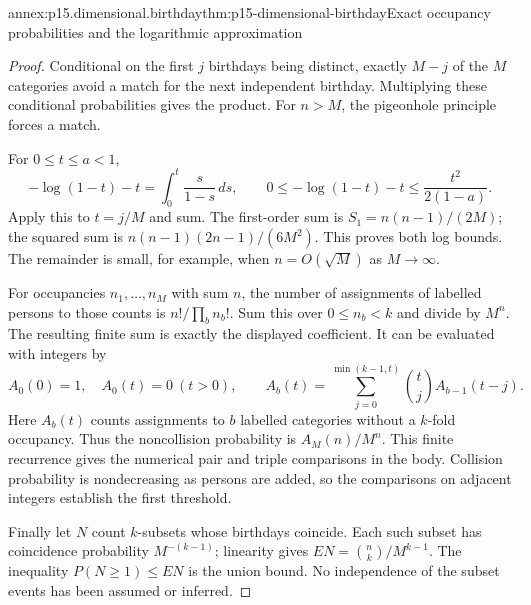 \begin{annexitem}{annex:p15.dimensional.birthday}{thm:p15-dimensional-birthday}{Exact occupancy probabilities and the logarithmic approximation}
\begin{proof}
Conditional on the first \(j\) birthdays being distinct, exactly \(M-j\)
of the \(M\) categories avoid a match for the next independent birthday.
Multiplying these conditional probabilities gives the product.
For \(n>M\), the pigeonhole principle forces a match.

For \(0\leq t\leq a<1\),
\[
 -\log(1-t)-t=\int_0^t\frac{s}{1-s}\,ds,
 \qquad
 0\leq-\log(1-t)-t\leq\frac{t^2}{2(1-a)}.
\]
Apply this to \(t=j/M\) and sum. The first-order sum is
\(S_1=n(n-1)/(2M)\); the squared sum is
\(n(n-1)(2n-1)/(6M^2)\). This proves both log bounds.
The remainder is small, for example, when \(n=O(\sqrt M)\) as
\(M\to\infty\).

For occupancies \(n_1,\ldots,n_M\) with sum \(n\), the number of
assignments of labelled persons to those counts is
\(n!/\prod_b n_b!\). Sum this over \(0\leq n_b<k\) and divide by
\(M^n\). The resulting finite sum is exactly the displayed coefficient.
It can be evaluated with integers by
\[
 A_0(0)=1,\quad A_0(t)=0\ (t>0),\qquad
 A_b(t)=\sum_{j=0}^{\min(k-1,t)}\binom tj A_{b-1}(t-j).
\]
Here \(A_b(t)\) counts assignments to \(b\) labelled categories without a
\(k\)-fold occupancy. Thus the noncollision probability is \(A_M(n)/M^n\).
This finite recurrence gives the numerical pair and triple comparisons in
the body. Collision probability is nondecreasing as persons are added,
so the comparisons on adjacent integers establish the first threshold.

Finally let \(N\) count \(k\)-subsets whose birthdays coincide.
Each such subset has coincidence probability \(M^{-(k-1)}\);
linearity gives \(EN=\binom nk/M^{k-1}\).
The inequality \(P(N\geq1)\leq EN\) is the union bound.
No independence of the subset events has been assumed or inferred.
\end{proof}
\end{annexitem}

